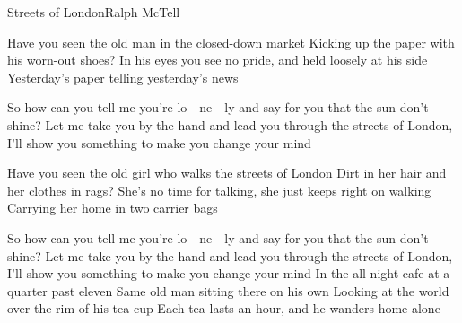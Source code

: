 \begin{song}{Streets of London}{Ralph McTell}{}


Have you seen the old man in the closed-down market
Kicking up the paper with his worn-out shoes?
In his eyes you see no pride, and held loosely at his side
  Yesterday's paper telling yesterday's news

So how can you tell me you're lo - ne - ly
  and say for you that the sun don't shine?
Let me take you by the hand and lead you through the streets of London,
  I'll show you something to make you change your mind


Have you seen the old girl who walks the streets of London
Dirt in her hair and her clothes in rags?
She's no time for talking, she just keeps right on walking
Carrying her home in two carrier bags

So how can you tell me you're lo - ne - ly
  and say for you that the sun don't shine?
Let me take you by the hand and lead you through the streets of London,
  I'll show you something to make you change your mind
\newpage
{}
In the all-night cafe at a quarter past eleven
Same old man sitting there on his own
Looking at the world over the rim of his tea-cup
Each tea lasts an hour, and he wanders home alone


\end{song}
